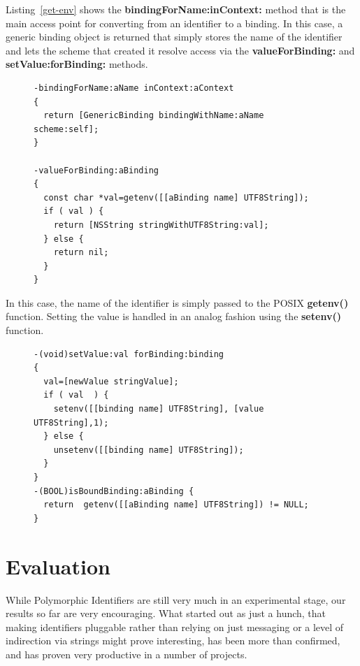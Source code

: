 \documentclass{acm_proc_article-sp}
\begin{document}
Listing~\ref{get-env} 
shows the {\bf bindingForName:inContext:} method that is the main access point for
converting from an identifier to a binding.  In this case, a generic binding object is returned
that simply stores the name of the identifier and lets the scheme that created it resolve
access via the {\bf valueForBinding:} and {\bf setValue:forBinding:} methods.


\begin{figure}[htbp]
\begin{lstlisting}[style=numbers,label=get-env,caption=Basic lookup in env: scheme.]
-bindingForName:aName inContext:aContext
{
  return [GenericBinding bindingWithName:aName scheme:self];
}

-valueForBinding:aBinding
{
  const char *val=getenv([[aBinding name] UTF8String]);
  if ( val ) {
    return [NSString stringWithUTF8String:val];
  } else {
    return nil;
  }
}
\end{lstlisting}
\end{figure}

In this case, the name of the identifier is simply passed to the POSIX {\bf getenv()} function.
Setting the value is handled in an analog fashion using the {\bf setenv()} function.


\begin{figure}[htbp]
\begin{lstlisting}[style=numbers,label=setvalue-env,caption=Set and check value in env: scheme.]
-(void)setValue:val forBinding:binding
{
  val=[newValue stringValue];
  if ( val  ) {
    setenv([[binding name] UTF8String], [value UTF8String],1);
  } else {
    unsetenv([[binding name] UTF8String]);
  }
}
-(BOOL)isBoundBinding:aBinding {
  return  getenv([[aBinding name] UTF8String]) != NULL;
}
\end{lstlisting}
\end{figure}



\section{Evaluation}
\label{evaluation}

While Polymorphic Identifiers are still very much in an experimental stage, our
results so far are very encouraging.  What started out as just a hunch, that making
identifiers pluggable rather than relying on just messaging or a level of indirection
via strings might prove interesting, has been more than confirmed, and has proven
very productive in a number of projects.
\end{document}
